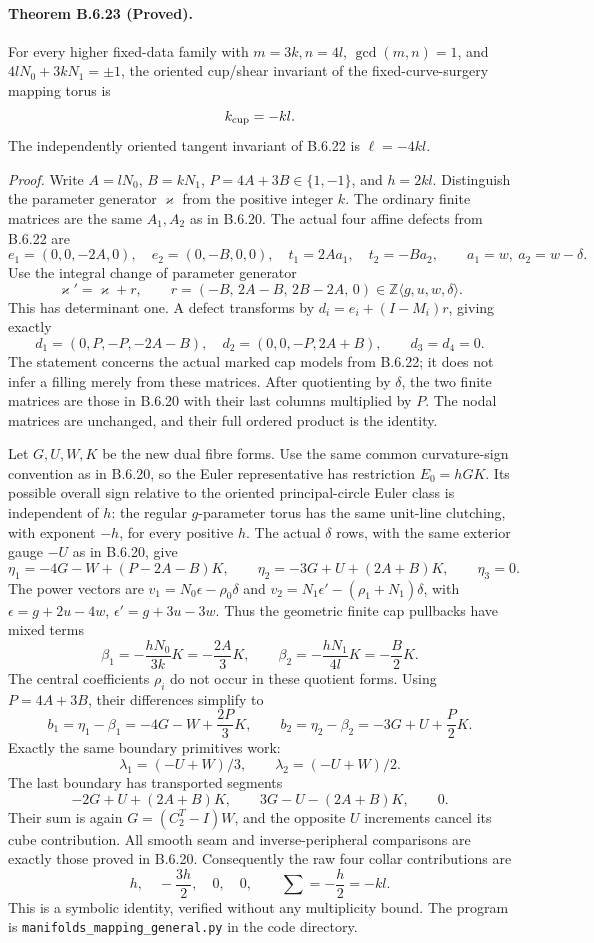 \paragraph{Theorem B.6.23 (Proved).}
For every higher fixed-data family with $m=3k,n=4l$,
$\gcd(m,n)=1$, and $4lN_0+3kN_1=\pm1$, the oriented cup/shear
invariant of the fixed-curve-surgery mapping torus is
\[
                         k_{\rm cup}=-kl.
\]
The independently oriented tangent invariant of B.6.22 is
$\ell=-4kl$.

\emph{Proof.} Write $A=lN_0$, $B=kN_1$, $P=4A+3B\in\{1,-1\}$,
and $h=2kl$. Distinguish the parameter generator $\varkappa$ from the
positive integer $k$. The ordinary finite matrices are the same $A_1,A_2$
as in B.6.20. The actual four affine defects from B.6.22 are
\[
 e_1=(0,0,-2A,0),\quad e_2=(0,-B,0,0),\quad
 t_1=2A a_1,\quad t_2=-B a_2,
 \qquad a_1=w,\ a_2=w-\delta.
\]
Use the integral change of parameter generator
\[
 \varkappa'=\varkappa+r,\qquad
 r=(-B,\,2A-B,\,2B-2A,\,0)\in\mathbb Z\langle g,u,w,\delta\rangle.
\]
This has determinant one. A defect transforms by
$d_i=e_i+(I-M_i)r$, giving exactly
\[
 d_1=(0,P,-P,-2A-B),\quad d_2=(0,0,-P,2A+B),\qquad
 d_3=d_4=0.
\]
The statement concerns the actual marked cap models from B.6.22;
it does not infer a filling merely from these matrices.
After quotienting by $\delta$, the two finite matrices are those in
B.6.20 with their last columns multiplied by $P$. The nodal matrices
are unchanged, and their full ordered product is the identity.

Let $G,U,W,K$ be the new dual fibre forms. Use the same common
curvature-sign convention as in B.6.20, so the Euler representative
has restriction $E_0=hGK$. Its possible overall sign relative to
the oriented principal-circle Euler class is independent of $h$:
the regular $g$-parameter torus has the same unit-line clutching,
with exponent $-h$, for every positive $h$. The actual $\delta$ rows, with the same exterior gauge $-U$
as in B.6.20, give
\[
 \eta_1=-4G-W+(P-2A-B)K,\qquad
 \eta_2=-3G+U+(2A+B)K,\qquad\eta_3=0.
\]
The power vectors are
$v_1=N_0\epsilon-\rho_0\delta$ and
$v_2=N_1\epsilon'-(\rho_1+N_1)\delta$, with
$\epsilon=g+2u-4w$, $\epsilon'=g+3u-3w$.
Thus the geometric finite cap pullbacks have mixed terms
\[
 \beta_1=-\frac{hN_0}{3k}K=-\frac{2A}{3}K,
 \qquad
 \beta_2=-\frac{hN_1}{4l}K=-\frac B2K.
\]
The central coefficients $\rho_i$ do not occur in these quotient forms.
Using $P=4A+3B$, their differences simplify to
\[
 b_1=\eta_1-\beta_1=-4G-W+\frac{2P}{3}K,
 \qquad
 b_2=\eta_2-\beta_2=-3G+U+\frac P2K.
\]
Exactly the same boundary primitives work:
\[
 \lambda_1=(-U+W)/3,\qquad\lambda_2=(-U+W)/2.
\]
The last boundary has transported segments
\[
 -2G+U+(2A+B)K,\qquad
 3G-U-(2A+B)K,\qquad0.
\]
Their sum is again $G=(C_2^T-I)W$, and the opposite $U$ increments
cancel its cube contribution. All smooth seam and inverse-peripheral
comparisons are exactly those proved in B.6.20. Consequently the raw
four collar contributions are
\[
                         h,\quad-\frac{3h}{2},\quad0,\quad0,
 \qquad \sum=-\frac h2=-kl.
\]
This is a symbolic identity, verified without any multiplicity bound.
The program is \texttt{manifolds\_mapping\_general.py} in the code directory.

